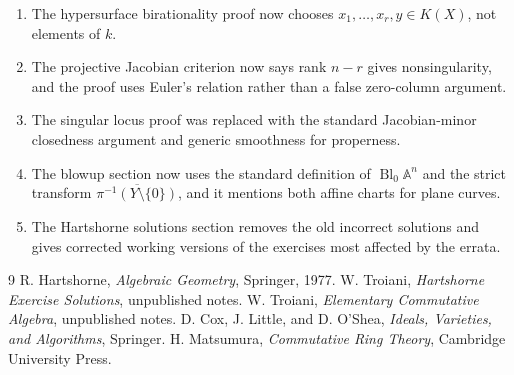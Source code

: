 \documentclass[12pt]{article}
\theoremstyle{plain}
\theoremstyle{definition}
\newcommand{\bb}[1]{\mathbb{#1}}
\begin{document}
\begin{enumerate}
\item The hypersurface birationality proof now chooses $x_1,\ldots,x_r,y\in K(X)$, not elements of $k$.
\item The projective Jacobian criterion now says rank $n-r$ gives nonsingularity, and the proof uses Euler's relation rather than a false zero-column argument.
\item The singular locus proof was replaced with the standard Jacobian-minor closedness argument and generic smoothness for properness.
\item The blowup section now uses the standard definition of $\operatorname{Bl}_0\bb A^n$ and the strict transform $\overline{\pi^{-1}(Y\setminus\{0\})}$, and it mentions both affine charts for plane curves.
\item The Hartshorne solutions section removes the old incorrect solutions and gives corrected working versions of the exercises most affected by the errata.
\end{enumerate}



\begin{thebibliography}{9}
 R. Hartshorne, \emph{Algebraic Geometry}, Springer, 1977.
 W. Troiani, \emph{Hartshorne Exercise Solutions}, unpublished notes.
 W. Troiani, \emph{Elementary Commutative Algebra}, unpublished notes.
 D. Cox, J. Little, and D. O'Shea, \emph{Ideals, Varieties, and Algorithms}, Springer.
 H. Matsumura, \emph{Commutative Ring Theory}, Cambridge University Press.
\end{thebibliography}
\end{document}
